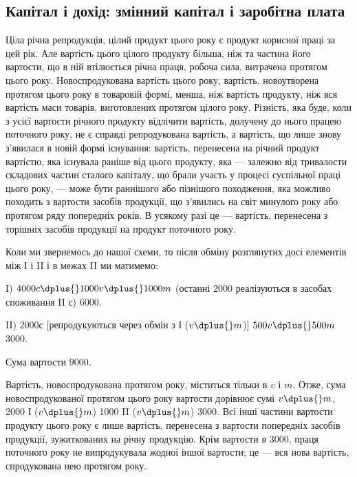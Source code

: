 
\subsection[Капітал і дохід: змінний капітал і заробітна плата]{Капітал і дохід: змінний капітал і заробітна плата\footnotemark{}}

\label{original-338}
Ціла
річна репродукція, цілий продукт цього року є продукт корисної
праці за цей рік. Але вартість цього цілого продукту більша, ніж
та частина його вартости, що в ній втілюється річна праця, робоча
сила, витрачена протягом цього року. Новоспродукована вартість
цього року, вартість, новоутворена протягом цього року в товаровій
формі, менша, ніж вартість продукту, ніж вся вартість маси товарів,
виготовлених протягом цілого року. Різність, яка буде, коли з усієї
вартости річного продукту відлічити вартість, долучену до нього працею
поточного року, не є справді репродукована вартість, а вартість, що лише
знову з’явилася в новій формі існування: вартість, перенесена на річний
продукт вартістю, яка існувала раніше від цього продукту, яка — залежно
від тривалости складових частин сталого капіталу, що брали участь у
процесі суспільної праці цього року, — може бути раннішого або пізнішого
походження, яка можливо походить з вартости засобів продукції,
що з’явились на світ минулого року або протягом ряду попередніх років.
В усякому разі це — вартість, перенесена з торішніх засобів продукції
на продукт поточного року.

Коли ми звернемось до нашої схеми, то після обміну розглянутих досі
елементів між І і II і в межах II ми матимемо:

I) $4000 c \dplus{} 1000 v \dplus{} 1000 m$ (останні 2000 реалізуються в засобах
споживання II с) \deq{} 6000.

II) $2000 с$ [репродукуються через обмін з І ($v \dplus{} m$)] \dplus{} $500 v \dplus{} 500 m$ \deq{} 3000.

Сума вартости \deq{} 9000.

Вартість, новоспродукована протягом року, міститься тільки в $v$ і $m$.
Отже, сума новоспродукованої протягом цього року вартости дорівнює
сумі $v \dplus{} m$, \deq{} 2000 І ($v \dplus{} m$) \dplus{} 1000 II ($v \dplus{} m$) \deq{} 3000. Всі інші частини
вартости продукту цього року є лише вартість, перенесена з вартости
попередніх засобів продукції, зужиткованих на річну продукцію.
Крім вартости в 3000, праця поточного року не випродукувала жодної
іншої вартости; це — вся нова вартість, спродукована нею протягом року.


